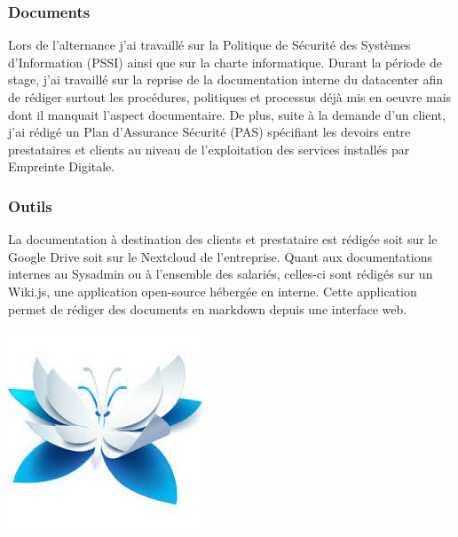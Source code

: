 \documentclass[12pt]{article}
\begin{document}
\subsubsection{Documents}
Lors de l'alternance j'ai travaillé sur la Politique de Sécurité des Systèmes d'Information (PSSI) ainsi que sur la charte informatique. 
Durant la période de stage, j'ai travaillé sur la reprise de la documentation interne du datacenter afin de rédiger surtout les procédures, politiques et processus déjà mis en oeuvre mais dont il manquait l'aspect documentaire.
De plus, suite à la demande d'un client, j'ai rédigé un Plan d'Assurance Sécurité (\gls{PAS}) spécifiant les devoirs entre prestataires et clients au niveau de l'exploitation des services installés par Empreinte Digitale.

\subsubsection{Outils}

\noindent%
\begin{minipage}{.7\textwidth}%
La documentation à destination des clients et prestataire est rédigée soit sur le Google Drive soit sur le \gls{Nextcloud} de l'entreprise. 
Quant aux documentations internes au Sysadmin ou à l'ensemble des salariés, celles-ci sont rédigés sur un Wiki.js, une application open-source hébergée en interne. 
Cette application permet de rédiger des documents en markdown depuis une interface web.

\end{minipage}%
\hfill
\begin{minipage}{.3\textwidth}%
\begin{center}
\includegraphics[width=.6\textwidth]{src/logo_wikijs.jpeg}
\end{center}
\end{minipage}%
\end{document}
